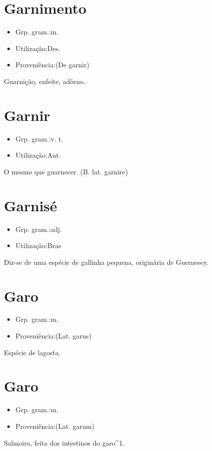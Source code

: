 \section{Garnimento}
\begin{itemize}
\item {Grp. gram.:m.}
\end{itemize}
\begin{itemize}
\item {Utilização:Des.}
\end{itemize}
\begin{itemize}
\item {Proveniência:(De \textunderscore garnir\textunderscore )}
\end{itemize}
Guarnição, enfeite, adôrno.
\section{Garnir}
\begin{itemize}
\item {Grp. gram.:v. t.}
\end{itemize}
\begin{itemize}
\item {Utilização:Ant.}
\end{itemize}
O mesmo que \textunderscore guarnecer\textunderscore .
(B. lat. \textunderscore garnire\textunderscore )
\section{Garnisé}
\begin{itemize}
\item {Grp. gram.:adj.}
\end{itemize}
\begin{itemize}
\item {Utilização:Bras}
\end{itemize}
Diz-se de uma espécie de gallinha pequena, originária de Guernesey.
\section{Garo}
\begin{itemize}
\item {Grp. gram.:m.}
\end{itemize}
\begin{itemize}
\item {Proveniência:(Lat. \textunderscore garus\textunderscore )}
\end{itemize}
Espécie de lagosta.
\section{Garo}
\begin{itemize}
\item {Grp. gram.:m.}
\end{itemize}
\begin{itemize}
\item {Proveniência:(Lat. \textunderscore garum\textunderscore )}
\end{itemize}
Salmoira, feita dos intestinos do garo^1.
